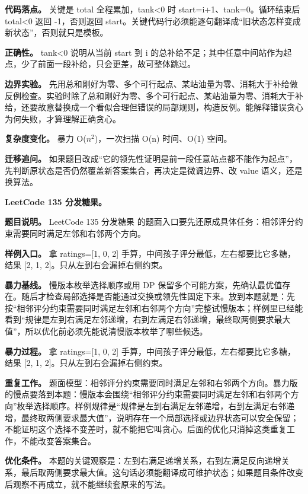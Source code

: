 \textbf{代码落点。} 关键是 total 全程累加，tank<0 时 start=i+1、tank=0。循环结束后 total<0 返回 -1，否则返回 start。关键代码行必须能逐句翻译成“旧状态怎样变成新状态”，否则就只是模板。

\textbf{正确性。} tank<0 说明从当前 start 到 i 的总补给不足；其中任意中间站作为起点，少了前面一段补给，只会更差，故可整体跳过。

\textbf{边界实验。} 先用总和刚好为零、多个可行起点、某站油量为零、消耗大于补给做反例检查。实验时除了总和刚好为零、多个可行起点、某站油量为零、消耗大于补给，还要故意替换成一个看似合理但错误的局部规则，构造反例。能解释错误贪心为何失败，才算理解正确贪心。

\textbf{复杂度变化。} 暴力 O(\ensuremath{n^{2}})，一次扫描 O(n) 时间、O(1) 空间。

\textbf{迁移追问。} 如果题目改成“它的领先性证明是前一段任意站点都不能作为起点”，先判断原状态是否仍然覆盖新答案集合，再决定是微调边界、改 value 语义，还是换算法。

\noindent\textbf{LeetCode 135 分发糖果。}

\textbf{题目说明。} LeetCode 135 分发糖果 的题面入口要先还原成具体任务：相邻评分约束需要同时满足左邻和右邻两个方向。

\textbf{样例入口。} 拿 ratings=[1, 0, 2] 手算，中间孩子评分最低，左右都要比它多糖，结果 [2, 1, 2]。只从左到右会漏掉右侧约束。

\textbf{暴力基线。} 慢版本枚举选择顺序或用 DP 保留多个可能方案，先确认最优值存在。随后才检查局部选择是否能通过交换或领先性固定下来。放到本题就是：先按“相邻评分约束需要同时满足左邻和右邻两个方向”完整试慢版本；样例里已经能看到“规律是左到右满足左邻递增，右到左满足右邻递增，最终取两侧要求最大值”，所以优化前必须先能说清慢版本枚举了哪些候选。

\textbf{暴力过程。} 拿 ratings=[1, 0, 2] 手算，中间孩子评分最低，左右都要比它多糖，结果 [2, 1, 2]。只从左到右会漏掉右侧约束。

\textbf{重复工作。} 题面模型：相邻评分约束需要同时满足左邻和右邻两个方向。暴力版的慢点要落到本题：慢版本会围绕“相邻评分约束需要同时满足左邻和右邻两个方向”枚举选择顺序。样例规律是“规律是左到右满足左邻递增，右到左满足右邻递增，最终取两侧要求最大值”，说明存在一个局部选择或边界状态可以安全保留；不能证明这个选择不变差时，就不能把它叫贪心。后面的优化只消掉这类重复工作，不能改变答案集合。

\textbf{优化条件。} 本题的关键观察是：左到右满足递增关系，右到左满足反向递增关系，最后取两侧要求最大值。这句话必须能翻译成可维护状态；如果题目条件改变后观察不再成立，就不能继续套原来的写法。

